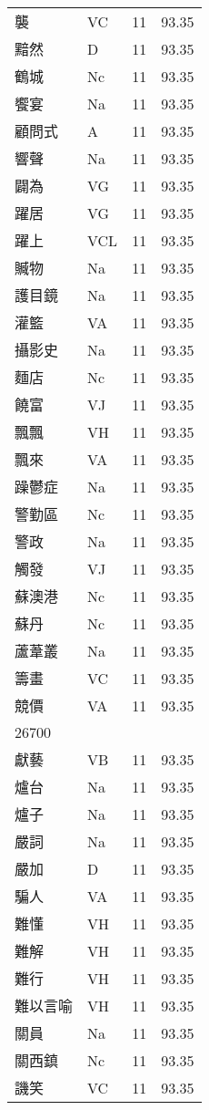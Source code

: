 \documentclass[twocolumn]{book}
\begin{document}
\begin{supertabular}{llrr}
襲 & VC & 11 &  93.35\\
黯然 & D & 11 &  93.35\\
鶴城 & Nc & 11 &  93.35\\
饗宴 & Na & 11 &  93.35\\
顧問式 & A & 11 &  93.35\\
響聲 & Na & 11 &  93.35\\
闢為 & VG & 11 &  93.35\\
躍居 & VG & 11 &  93.35\\
躍上 & VCL & 11 &  93.35\\
贓物 & Na & 11 &  93.35\\
護目鏡 & Na & 11 &  93.35\\
灌籃 & VA & 11 &  93.35\\
攝影史 & Na & 11 &  93.35\\
麵店 & Nc & 11 &  93.35\\
饒富 & VJ & 11 &  93.35\\
飄飄 & VH & 11 &  93.35\\
飄來 & VA & 11 &  93.35\\
躁鬱症 & Na & 11 &  93.35\\
警勤區 & Nc & 11 &  93.35\\
警政 & Na & 11 &  93.35\\
觸發 & VJ & 11 &  93.35\\
蘇澳港 & Nc & 11 &  93.35\\
蘇丹 & Nc & 11 &  93.35\\
蘆葦叢 & Na & 11 &  93.35\\
籌畫 & VC & 11 &  93.35\\
競價 & VA & 11 &  93.35\\
26700\\
獻藝 & VB & 11 &  93.35\\
爐台 & Na & 11 &  93.35\\
爐子 & Na & 11 &  93.35\\
嚴詞 & Na & 11 &  93.35\\
嚴加 & D & 11 &  93.35\\
騙人 & VA & 11 &  93.35\\
難懂 & VH & 11 &  93.35\\
難解 & VH & 11 &  93.35\\
難行 & VH & 11 &  93.35\\
難以言喻 & VH & 11 &  93.35\\
關員 & Na & 11 &  93.35\\
關西鎮 & Nc & 11 &  93.35\\
譏笑 & VC & 11 &  93.35\\

\end{supertabular}
\end{document}
